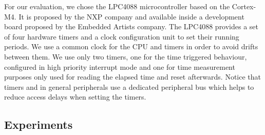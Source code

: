 \documentclass[conference,compsocconf]{IEEEtran}
\begin{document}
For our evaluation, we chose the LPC4088 microcontroller based on the
Cortex-M4. It is proposed by the NXP company and available inside a
development board proposed by the Embedded Artists company.
The LPC4088 provides a set of four hardware timers and a clock configuration
unit to set their running periods. We use a common clock for the CPU and timers
in order to avoid drifts between them. We use only two timers, one for the time
triggered behaviour, configured in high priority interrupt mode and one for
time measurement purposes only used for reading the elapsed time and reset
afterwards. Notice that timers and in general peripherals use a dedicated
peripheral bus which helps to reduce access delays when setting the timers.


\subsection{Experiments}

\end{document}
